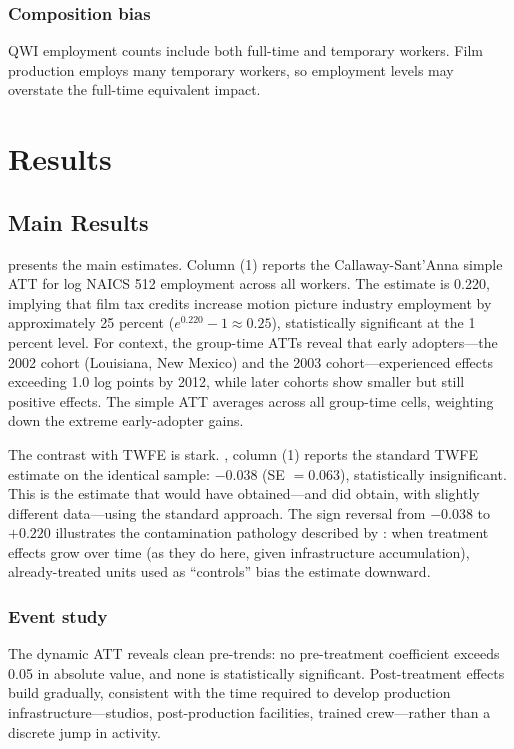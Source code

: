 \documentclass[12pt]{article}
\begin{document}
\subsubsection*{Composition bias} QWI employment counts include both full-time and temporary workers. Film production employs many temporary workers, so employment levels may overstate the full-time equivalent impact.


\section{Results}
\label{sec:results}

\subsection{Main Results}

 presents the main estimates. Column (1) reports the Callaway-Sant'Anna simple ATT for log NAICS 512 employment across all workers. The estimate is 0.220, implying that film tax credits increase motion picture industry employment by approximately 25 percent ($e^{0.220} - 1 \approx 0.25$), statistically significant at the 1 percent level. For context, the group-time ATTs reveal that early adopters---the 2002 cohort (Louisiana, New Mexico) and the 2003 cohort---experienced effects exceeding 1.0 log points by 2012, while later cohorts show smaller but still positive effects. The simple ATT averages across all group-time cells, weighting down the extreme early-adopter gains.

The contrast with TWFE is stark. , column (1) reports the standard TWFE estimate on the identical sample: $-0.038$ (SE $= 0.063$), statistically insignificant. This is the estimate that \citet{button2019producers} would have obtained---and did obtain, with slightly different data---using the standard approach. The sign reversal from $-0.038$ to $+0.220$ illustrates the contamination pathology described by \citet{de2020two}: when treatment effects grow over time (as they do here, given infrastructure accumulation), already-treated units used as ``controls'' bias the estimate downward.

\subsubsection*{Event study} The dynamic ATT reveals clean pre-trends: no pre-treatment coefficient exceeds 0.05 in absolute value, and none is statistically significant. Post-treatment effects build gradually, consistent with the time required to develop production infrastructure---studios, post-production facilities, trained crew---rather than a discrete jump in activity.
\end{document}
